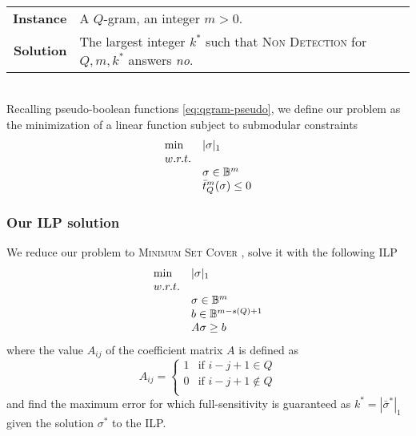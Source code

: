 \paragraph{}
\begin{tabular}{rl}
{\bf Instance}	&	A $Q$-gram, an integer $m > 0$.\\
{\bf Solution}	&	The largest integer $k^*$ such that \textsc{Non Detection} for $Q,m,k^*$ answers \emph{no}.\\
\end{tabular}
\\

Recalling pseudo-boolean functions \ref{eq:qgram-pseudo}, we define our problem as the minimization of a linear function subject to submodular constraints
\begin{equation}
\begin{array}{ll}
\text{min} & |\sigma|_1			\\
w.r.t.								\\
& \sigma \in \mathbb {B}^m					\\
& \bar{t}_{Q}^{m}(\sigma) \leq 0	\\
\end{array}
\end{equation}

\subsubsection{Our ILP solution}

We reduce our problem to \textsc{Minimum Set Cover} \citep{NemhauserWolsey99}, solve it with the following ILP
\begin{equation}
\begin{array}{ll}
\text{min} & |\sigma|_1	\\
w.r.t.				\\
& \sigma \in \mathbb {B}^m	\\
& b \in \mathbb {B}^{m-s(Q)+1}\\
& A\sigma \geq b	\\
\end{array}
\end{equation}
where the value $A_{ij}$ of the coefficient matrix $A$ is defined as
\begin{equation}
A_{ij} = 
\left\{
	\begin{array}{ll}
		1  & \mbox{if } i-j+1 \in Q		\\
		0  & \mbox{if } i-j+1 \notin Q	\\
	\end{array}
\right.
\end{equation}
and find the maximum error for which full-sensitivity is guaranteed as $k^* = |\bar{\sigma}^*|_1$ given the solution $\sigma^*$ to the ILP.

